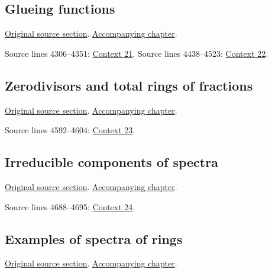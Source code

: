 \subsection{Glueing functions}
\hypertarget{algebra-source-section-tilde-module-sheaf}{}
\noindent\href{https://github.com/stacks/stacks-project/blob/a04446e57ec1fbc252a871afcec7752fb2807b14/algebra.tex\#L4284}{Original source section}. \href{algebra.pdf\#nameddest=section-tilde-module-sheaf}{Accompanying chapter}.

\begin{AlgebraSourceRoutes}
 Source lines 4306--4351: \hyperlink{algebra-context-021}{Context 21}.
 Source lines 4438--4523: \hyperlink{algebra-context-022}{Context 22}.
\end{AlgebraSourceRoutes}

\subsection{Zerodivisors and total rings of fractions}
\hypertarget{algebra-source-section-total-quotient-ring}{}
\noindent\href{https://github.com/stacks/stacks-project/blob/a04446e57ec1fbc252a871afcec7752fb2807b14/algebra.tex\#L4536}{Original source section}. \href{algebra.pdf\#nameddest=section-total-quotient-ring}{Accompanying chapter}.

\begin{AlgebraSourceRoutes}
 Source lines 4592--4604: \hyperlink{algebra-context-023}{Context 23}.
\end{AlgebraSourceRoutes}

\subsection{Irreducible components of spectra}
\hypertarget{algebra-source-section-irreducible}{}
\noindent\href{https://github.com/stacks/stacks-project/blob/a04446e57ec1fbc252a871afcec7752fb2807b14/algebra.tex\#L4656}{Original source section}. \href{algebra.pdf\#nameddest=section-irreducible}{Accompanying chapter}.

\begin{AlgebraSourceRoutes}
 Source lines 4688--4695: \hyperlink{algebra-context-024}{Context 24}.
\end{AlgebraSourceRoutes}

\subsection{Examples of spectra of rings}
\hypertarget{algebra-source-section-examples-spectra}{}
\noindent\href{https://github.com/stacks/stacks-project/blob/a04446e57ec1fbc252a871afcec7752fb2807b14/algebra.tex\#L4816}{Original source section}. \href{algebra.pdf\#nameddest=section-examples-spectra}{Accompanying chapter}.

